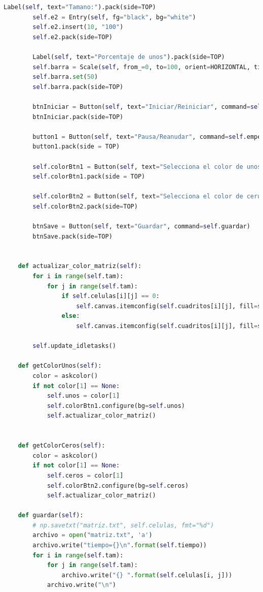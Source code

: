 \begin{lstlisting}[language=Python]
        Label(self, text="Tamano:").pack(side=TOP)
        self.e2 = Entry(self, fg="black", bg="white")
        self.e2.insert(10, "100")
        self.e2.pack(side=TOP)

        Label(self, text="Porcentaje de unos").pack(side=TOP)
        self.barra = Scale(self, from_=0, to=100, orient=HORIZONTAL, tickinterval=50)
        self.barra.set(50)
        self.barra.pack(side=TOP)

        btnIniciar = Button(self, text="Iniciar/Reiniciar", command=self.iniciar)
        btnIniciar.pack(side=TOP)

        button1 = Button(self, text="Pausa/Reanudar", command=self.empezar_dentener)
        button1.pack(side = TOP)

        self.colorBtn1 = Button(self, text="Selecciona el color de unos", command=self.getColorUnos, bg=self.unos)
        self.colorBtn1.pack(side = TOP)

        self.colorBtn2 = Button(self, text="Selecciona el color de ceros", command=self.getColorCeros, bg=self.ceros)
        self.colorBtn2.pack(side=TOP)

        btnSave = Button(self, text="Guardar", command=self.guardar)
        btnSave.pack(side=TOP)


    def actualizar_color_matriz(self):
        for i in range(self.tam):
            for j in range(self.tam):
                if self.celulas[i][j] == 0:
                    self.canvas.itemconfig(self.cuadritos[i][j], fill=self.ceros)
                else:
                    self.canvas.itemconfig(self.cuadritos[i][j], fill=self.unos)

        self.update_idletasks()

    def getColorUnos(self):
        color = askcolor()
        if not color[1] == None:
            self.unos = color[1]
            self.colorBtn1.configure(bg=self.unos)
            self.actualizar_color_matriz()


    def getColorCeros(self):
        color = askcolor()
        if not color[1] == None:
            self.ceros = color[1]
            self.colorBtn2.configure(bg=self.ceros)
            self.actualizar_color_matriz()

    def guardar(self):
        # np.savetxt("matriz.txt", self.celulas, fmt="%d")
        archivo = open("matriz.txt", 'a')
        archivo.write("tiempo={}\n".format(self.tiempo))
        for i in range(self.tam):
            for j in range(self.tam):
                archivo.write("{} ".format(self.celulas[i, j]))
            archivo.write("\n")


\end{lstlisting}

